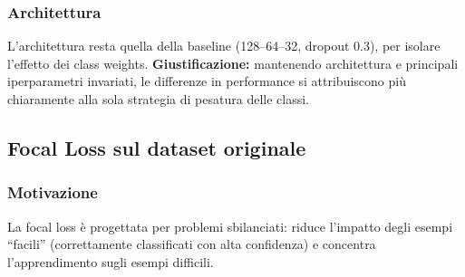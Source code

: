 \subsubsection{Architettura}
L'architettura resta quella della baseline (128--64--32, dropout 0.3), per isolare l'effetto dei class weights.
\textbf{Giustificazione:} mantenendo architettura e principali iperparametri invariati, le differenze in performance si attribuiscono più chiaramente alla sola strategia di pesatura delle classi.

\subsection{Focal Loss sul dataset originale}
\subsubsection{Motivazione}
La focal loss è progettata per problemi sbilanciati: riduce l'impatto degli esempi ``facili'' (correttamente classificati con alta confidenza) e concentra l'apprendimento sugli esempi difficili.

